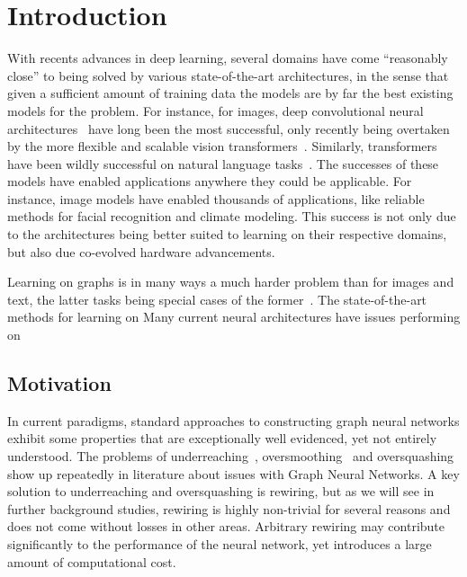\documentclass[../main.tex]{subfiles}
\begin{document}
    \chapter{Introduction}\label{ch:introduction}
    With recents advances in deep learning, several domains have come ``reasonably close'' to being solved by various state-of-the-art architectures, in the sense that given a sufficient amount of training data the models are by far the best existing models for the problem.
    For instance, for images, deep convolutional neural architectures~\cite{lecunGradientbasedLearningApplied1998} have long been the most successful, only recently being overtaken by the more flexible and scalable vision transformers~\cite{dosovitskiyImageWorth16x162021}.
    Similarly, transformers~\cite{vaswaniAttentionAllYou2017} have been wildly successful on natural language tasks~\cite{brownLanguageModelsAre2020}.
    The successes of these models have enabled applications anywhere they could be applicable.
    For instance, image models have enabled thousands of applications, like reliable methods for facial recognition and climate modeling.
    This success is not only due to the architectures being better suited to learning on their respective domains, but also due co-evolved hardware advancements.

    Learning on graphs is in many ways a much harder problem than for images and text, the latter tasks being special cases of the former~\cite{bronsteinGeometricDeepLearning2021}.
    The state-of-the-art methods for learning on
    Many current neural architectures have issues performing on

    \section{Motivation}\label{sec:motivation}
    In current paradigms, standard approaches to constructing graph neural networks exhibit some properties that are exceptionally well evidenced, yet not entirely understood.
    The problems of underreaching~\cite{alonBottleneckGraphNeural2021}, oversmoothing~\cite{chenMeasuringRelievingOversmoothing2019} and oversquashing~\cite{alonBottleneckGraphNeural2021, toppingUnderstandingOversquashingBottlenecks2022} show up repeatedly in literature about issues with Graph Neural Networks.
    A key solution to underreaching and oversquashing is rewiring, but as we will see in further background studies, rewiring is highly non-trivial for several reasons and does not come without losses in other areas.
    Arbitrary rewiring may contribute significantly to the performance of the neural network, yet introduces a large amount of computational cost.
\end{document}
